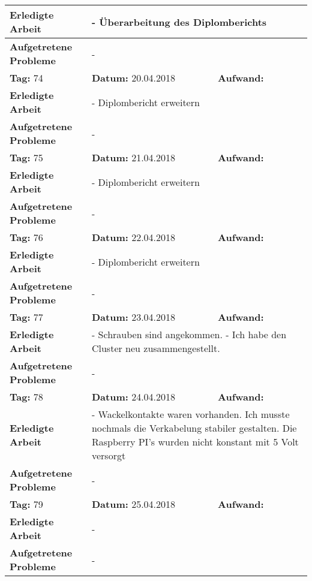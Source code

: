 \begin{longtable}{|p{5cm}|p{5cm}|p{6cm}|}
\textbf{Erledigte Arbeit} & \multicolumn{2}{p{11cm}|}{- Überarbeitung des Diplomberichts} \\ \hline
\textbf{Aufgetretene Probleme} & \multicolumn{2}{p{11cm}|}{-} \\ \hline
\rowcolor{heading}\textbf{Tag:} 74 & \textbf{Datum:} 20.04.2018 & \textbf{Aufwand:} \\ \hline
\textbf{Erledigte Arbeit} & \multicolumn{2}{p{11cm}|}{- Diplombericht erweitern} \\ \hline
\textbf{Aufgetretene Probleme} & \multicolumn{2}{p{11cm}|}{-} \\ \hline
\rowcolor{heading}\textbf{Tag:} 75 & \textbf{Datum:} 21.04.2018 & \textbf{Aufwand:} \\ \hline
\textbf{Erledigte Arbeit} & \multicolumn{2}{p{11cm}|}{- Diplombericht erweitern} \\ \hline
\textbf{Aufgetretene Probleme} & \multicolumn{2}{p{11cm}|}{-} \\ \hline
\rowcolor{heading}\textbf{Tag:} 76 & \textbf{Datum:} 22.04.2018 & \textbf{Aufwand:} \\ \hline
\textbf{Erledigte Arbeit} & \multicolumn{2}{p{11cm}|}{- Diplombericht erweitern} \\ \hline
\textbf{Aufgetretene Probleme} & \multicolumn{2}{p{11cm}|}{-} \\ \hline
\rowcolor{heading}\textbf{Tag:} 77 & \textbf{Datum:} 23.04.2018 & \textbf{Aufwand:} \\ \hline
\textbf{Erledigte Arbeit} & \multicolumn{2}{p{11cm}|}{- Schrauben sind angekommen.\newline
- Ich habe den Cluster neu zusammengestellt.} \\ \hline
\textbf{Aufgetretene Probleme} & \multicolumn{2}{p{11cm}|}{-} \\ \hline
\rowcolor{heading}\textbf{Tag:} 78 & \textbf{Datum:} 24.04.2018 & \textbf{Aufwand:} \\ \hline
\textbf{Erledigte Arbeit} & \multicolumn{2}{p{11cm}|}{- Wackelkontakte waren vorhanden. Ich musste nochmals die Verkabelung stabiler gestalten. Die Raspberry PI's wurden nicht konstant mit 5 Volt versorgt} \\ \hline
\textbf{Aufgetretene Probleme} & \multicolumn{2}{p{11cm}|}{-} \\ \hline
\rowcolor{heading}\textbf{Tag:} 79 & \textbf{Datum:} 25.04.2018 & \textbf{Aufwand:} \\ \hline
\textbf{Erledigte Arbeit} & \multicolumn{2}{p{11cm}|}{-} \\ \hline
\textbf{Aufgetretene Probleme} & \multicolumn{2}{p{11cm}|}{-} \\ \hline

\end{longtable}
